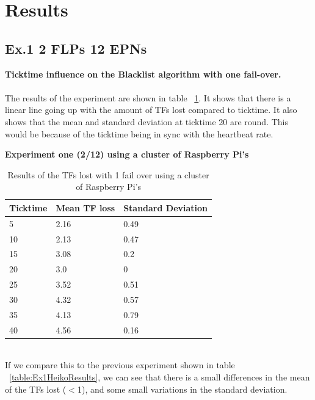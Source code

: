 \section{Results}
\subsection*{Ex.1 2 FLPs 12 EPNs}
\textbf{Ticktime influence on the Blacklist algorithm with one fail-over.}
\\~\\
The results of the experiment are shown in table ~\ref{table:Ex1MitchResults}. It shows that there is a linear line going up with the amount of TFs lost compared to ticktime. It also shows that the mean and standard deviation at ticktime 20 are round. This would be because of the ticktime being in sync with the heartbeat rate.

\begin{table}[h!]
\caption*{\textbf{Experiment one (2/12) using a cluster of Raspberry Pi's}}
\begin{tabular}{| l | l | l |}
\hline
Ticktime & Mean TF loss & Standard Deviation \\ \hline
5 & 2.16 & 0.49 \\ \hline
10 & 2.13 & 0.47 \\ \hline
15 & 3.08 & 0.2 \\ \hline
20 & 3.0 & 0 \\ \hline
25 & 3.52 & 0.51 \\ \hline
30 & 4.32 & 0.57 \\ \hline
35 & 4.13 & 0.79 \\ \hline
40 & 4.56 & 0.16 \\ \hline
\end{tabular}
\caption{Results of the TFs lost with 1 fail over using a cluster of Raspberry Pi's}
\label{table:Ex1MitchResults}
\end{table}

~\\ If we compare this to the previous experiment shown in table ~\ref{table:Ex1HeikoResults}, we can see that there is a small differences in the mean of the TFs lost ($<$1), and some small variations in the standard deviation.

